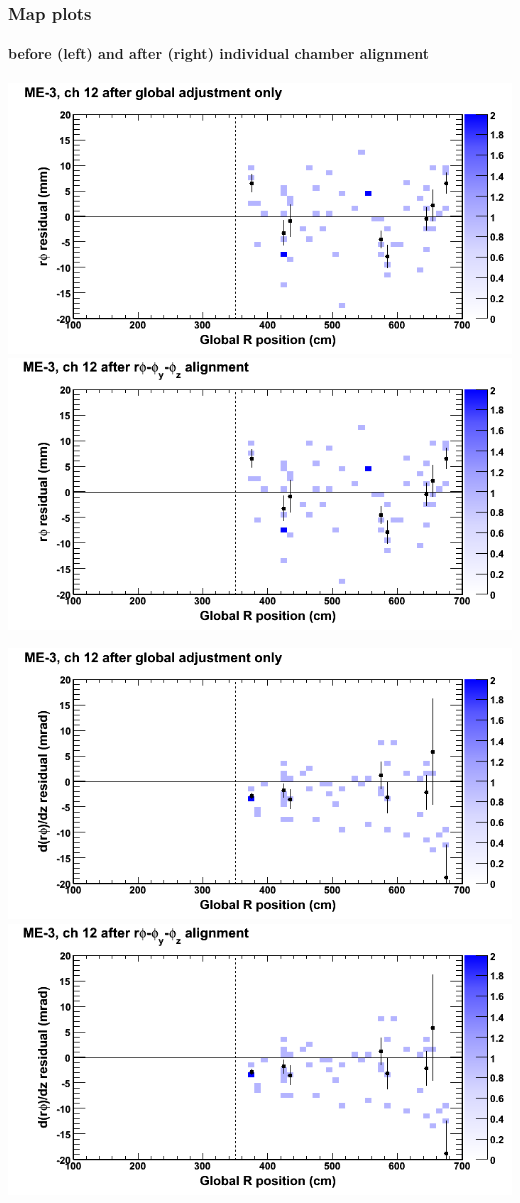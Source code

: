 \documentclass[compress]{beamer}
\begin{document}
\begin{frame}
\frametitle{Map plots}
\framesubtitle{before (left) and after (right) individual chamber alignment}
\includegraphics[width=0.5\linewidth]{ringmapplots_3dof/before_CSCvsr_mem3ch12_x.png} \includegraphics[width=0.5\linewidth]{ringmapplots_3dof/after_CSCvsr_mem3ch12_x.png}

\includegraphics[width=0.5\linewidth]{ringmapplots_3dof/before_CSCvsr_mem3ch12_dxdz.png} \includegraphics[width=0.5\linewidth]{ringmapplots_3dof/after_CSCvsr_mem3ch12_dxdz.png}
\end{frame}
\end{document}

